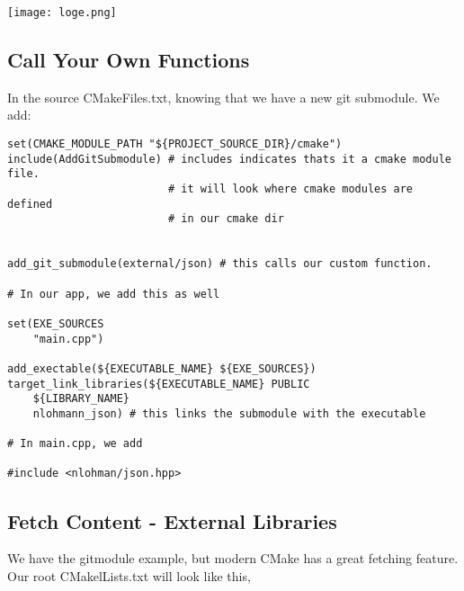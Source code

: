 \begin{center}
    \texttt{[image: loge.png]}
\end{center}



\subsection{Call Your Own Functions}

In the source CMakeFiles.txt, knowing that we have a new git submodule. We add:


\begin{verbatim}
set(CMAKE_MODULE_PATH "${PROJECT_SOURCE_DIR}/cmake")
include(AddGitSubmodule) # includes indicates thats it a cmake module file.
                         # it will look where cmake modules are defined
                         # in our cmake dir


add_git_submodule(external/json) # this calls our custom function.

# In our app, we add this as well

set(EXE_SOURCES
    "main.cpp")

add_exectable(${EXECUTABLE_NAME} ${EXE_SOURCES})
target_link_libraries(${EXECUTABLE_NAME} PUBLIC
    ${LIBRARY_NAME}
    nlohmann_json) # this links the submodule with the executable

# In main.cpp, we add 

#include <nlohman/json.hpp>
\end{verbatim}


\subsection{Fetch Content - External Libraries}

We have the gitmodule example, but modern CMake has a great fetching feature. Our root CMakelLists.txt will look like this, 

